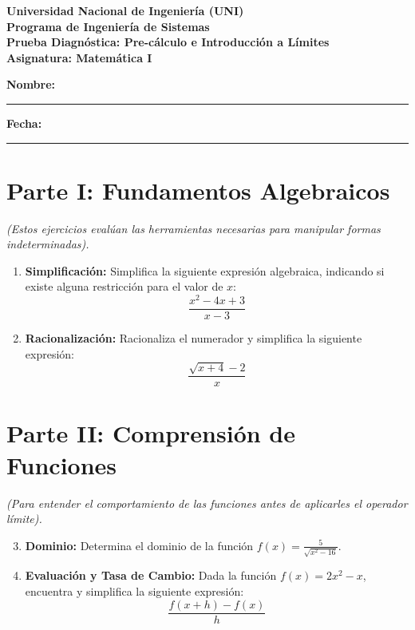 \documentclass[12pt,a4paper]{article}
\begin{document}
\begin{center}
    \Large \textbf{Universidad Nacional de Ingeniería (UNI)} \\
    \large \textbf{Programa de Ingeniería de Sistemas} \\
    \vspace{0.5cm}
    \textbf{Prueba Diagnóstica: Pre-cálculo e Introducción a Límites} \\
    \textbf{Asignatura: Matemática I}
\end{center}

\vspace{0.5cm}
\noindent\textbf{Nombre:} \rule{8cm}{0.4pt} \hfill \textbf{Fecha:} \rule{3cm}{0.4pt}
\vspace{0.5cm}

\section*{Parte I: Fundamentos Algebraicos}
\textit{(Estos ejercicios evalúan las herramientas necesarias para manipular formas indeterminadas).}

\begin{enumerate}
    \item \textbf{Simplificación:} Simplifica la siguiente expresión algebraica, indicando si existe alguna restricción para el valor de $x$:
    \[ \frac{x^2 - 4x + 3}{x - 3} \]

    \vspace{2.5cm}

    \item \textbf{Racionalización:} Racionaliza el numerador y simplifica la siguiente expresión:
    \[ \frac{\sqrt{x+4} - 2}{x} \]
\end{enumerate}

\vspace{2.5cm}

\section*{Parte II: Comprensión de Funciones}
\textit{(Para entender el comportamiento de las funciones antes de aplicarles el operador límite).}

\begin{enumerate}
    \setcounter{enumi}{2}
    \item \textbf{Dominio:} Determina el dominio de la función $f(x) = \frac{5}{\sqrt{x^2 - 16}}$.

    \vspace{2.5cm}

    \item \textbf{Evaluación y Tasa de Cambio:} Dada la función $f(x) = 2x^2 - x$, encuentra y simplifica la siguiente expresión:
    \[ \frac{f(x+h) - f(x)}{h} \]
\end{enumerate}
\end{document}
